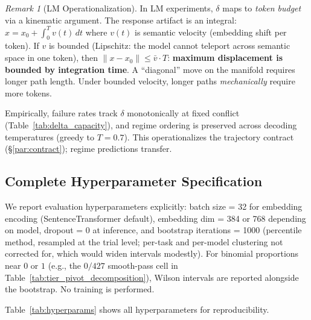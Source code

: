 \documentclass{article}
\theoremstyle{plain}
\theoremstyle{definition}
\theoremstyle{remark}
\newtheorem{remark}[theorem]{Remark}
\begin{document}
\begin{remark}[LM Operationalization]\label{rem:lm_budget}
In LM experiments, $\delta$ maps to \emph{token budget} via a kinematic argument. The response artifact is an integral: $x = x_0 + \int_0^T v(t)\,dt$ where $v(t)$ is semantic velocity (embedding shift per token). If $v$ is bounded (Lipschitz: the model cannot teleport across semantic space in one token), then $\|x - x_0\| \le \bar{v} \cdot T$: \textbf{maximum displacement is bounded by integration time}. A ``diagonal'' move on the manifold requires longer path length. Under bounded velocity, longer paths \emph{mechanically} require more tokens.

Empirically, failure rates track $\delta$ monotonically at fixed conflict (Table~\ref{tab:delta_capacity}), and regime ordering is preserved across decoding temperatures (greedy to $T=0.7$). This operationalizes the trajectory contract (\S\ref{par:contract}); regime predictions transfer.
\end{remark}

\subsection{Complete Hyperparameter Specification}

We report evaluation hyperparameters explicitly: batch size = 32 for embedding encoding (SentenceTransformer default), embedding dim = 384 or 768 depending on model, dropout = 0 at inference, and bootstrap iterations = 1000 (percentile method, resampled at the trial level; per-task and per-model clustering not corrected for, which would widen intervals modestly). For binomial proportions near $0$ or $1$ (e.g., the $0/427$ smooth-pass cell in Table~\ref{tab:tier_pivot_decomposition}), Wilson intervals are reported alongside the bootstrap. No training is performed.

Table~\ref{tab:hyperparams} shows all hyperparameters for reproducibility.
\end{document}
